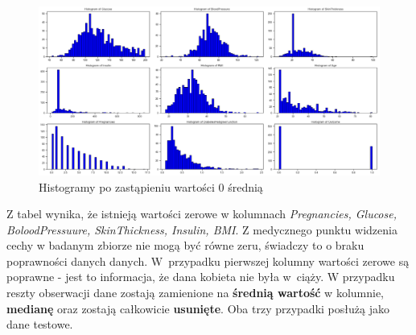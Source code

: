 \documentclass[12pt]{article}
\begin{document}
\begin{figure}
	\centering
	\includegraphics[width=1.2\textwidth]{images/hist_average.png}
	\caption{Histogramy po zastąpieniu wartości 0 średnią}
	\label{fig:outliers}
\end{figure}

Z tabel wynika, że istnieją wartości zerowe w kolumnach \textit{Pregnancies, Glucose, BoloodPressuure, SkinThickness, Insulin, BMI}. Z medycznego punktu widzenia cechy w badanym zbiorze nie mogą być równe zeru, świadczy to o braku poprawności danych danych. W~przypadku pierwszej kolumny wartości zerowe są poprawne - jest to informacja, że dana kobieta nie była w~ciąży. W przypadku reszty obserwacji dane zostają zamienione na \textbf{średnią wartość} w kolumnie, \textbf{medianę} oraz zostają całkowicie \textbf{usunięte}. Oba trzy przypadki posłużą jako dane testowe.
\end{document}
